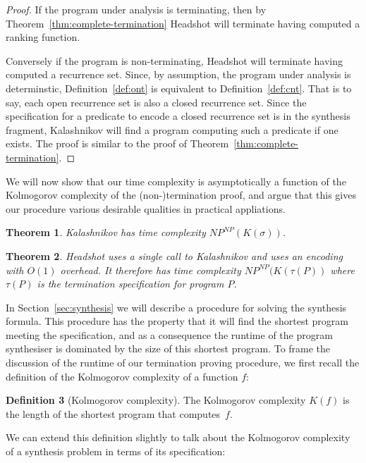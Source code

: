\documentclass[preprint]{sigplanconf}
\newtheorem{theorem}{Theorem}
\theoremstyle{definition}
\newtheorem{definition}[theorem]{Definition}
\begin{document}
\begin{proof}
 If the program under analysis is terminating, then by Theorem~\ref{thm:complete-termination} {\sc Headshot}
 will terminate having computed a ranking function.

 Conversely if the program is non-terminating, {\sc Headshot} will terminate
 having computed a recurrence set.  Since, by assumption, the program under analysis is determinstic,
 Definition~\ref{def:ont} is equivalent to Definition~\ref{def:cnt}.
 That is to say, each open recurrence set is also a closed recurrence set.  Since the specification for a predicate
 to encode a closed recurrence set is in the synthesis fragment, {\sc Kalashnikov} will find a program computing
 such a predicate if one exists.  The proof is similar to the proof of Theorem~\ref{thm:complete-termination}.
\end{proof}

We will now show that our time complexity is asymptotically a function of
the Kolmogorov complexity of the (non-)termination proof, and argue
that this gives our procedure various desirable qualities in practical
appliations.
%
\begin{theorem}
 {\sc Kalashnikov} has time complexity $NP^{NP}(K(\sigma))$.
\end{theorem}

\begin{theorem}
 {\sc Headshot} uses a single call to {\sc Kalashnikov} and uses an encoding with $O(1)$
 overhead.  It therefore has time complexity $NP^{NP}(K(\tau(P))$ where $\tau(P)$ is the
 termination specification for program $P$.
\end{theorem}

In Section~\ref{sec:synthesis} we will describe a procedure for solving the synthesis formula.
This procedure has the property that it will find the shortest program meeting the
specification, and as a consequence the runtime of the program synthesiser is dominated
by the size of this shortest program.  To frame the discussion of the runtime of our
termination proving procedure, we first recall the definition of the Kolmogorov complexity
of a function $f$:

\begin{definition}[Kolmogorov complexity]
 The Kolmogorov complexity $K(f)$ is the length of the shortest program that
 computes~$f$.
\end{definition}

We can extend this definition slightly to talk about the Kolmogorov complexity of a
synthesis problem in terms of its specification:
\end{document}
